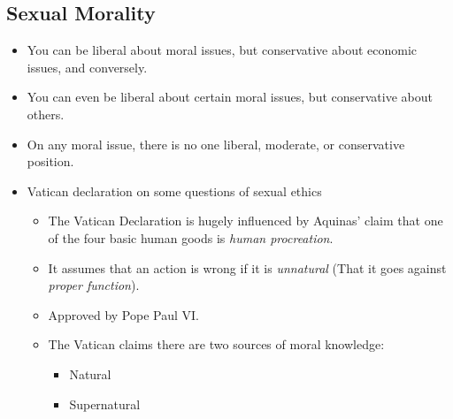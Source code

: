 \documentclass{article}
\begin{document}
\begin{spacing}{1.2}
        \section{Sexual Morality}
        \begin{itemize}
            \item You can be liberal about moral issues, but conservative about economic issues, and conversely.
            \item You can even be liberal about certain moral issues, but conservative about others.
            \item On any moral issue, there is no one liberal, moderate, or conservative position.
            \item Vatican declaration on some questions of sexual ethics
            \begin{itemize}
                \item The Vatican Declaration is hugely influenced by Aquinas' claim that one of the four basic human goods is \emph{human procreation}.
                \item It assumes that an action is wrong if it is \emph{unnatural} (That it goes against \emph{proper function}).
                \item Approved by Pope Paul VI.\@
                \item The Vatican claims there are two sources of moral knowledge:
                \begin{itemize}
                    \item Natural
                    \item Supernatural
                \end{itemize}
                
            \end{itemize}
        \end{itemize}
    \end{spacing}
\end{document}

